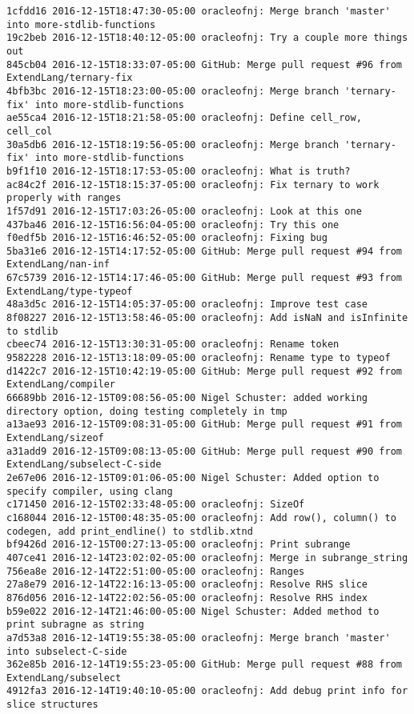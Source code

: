 \begin{lstlisting}
1cfdd16 2016-12-15T18:47:30-05:00 oracleofnj: Merge branch 'master' into more-stdlib-functions
19c2beb 2016-12-15T18:40:12-05:00 oracleofnj: Try a couple more things out
845cb04 2016-12-15T18:33:07-05:00 GitHub: Merge pull request #96 from ExtendLang/ternary-fix
4bfb3bc 2016-12-15T18:23:00-05:00 oracleofnj: Merge branch 'ternary-fix' into more-stdlib-functions
ae55ca4 2016-12-15T18:21:58-05:00 oracleofnj: Define cell_row, cell_col
30a5db6 2016-12-15T18:19:56-05:00 oracleofnj: Merge branch 'ternary-fix' into more-stdlib-functions
b9f1f10 2016-12-15T18:17:53-05:00 oracleofnj: What is truth?
ac84c2f 2016-12-15T18:15:37-05:00 oracleofnj: Fix ternary to work properly with ranges
1f57d91 2016-12-15T17:03:26-05:00 oracleofnj: Look at this one
437ba46 2016-12-15T16:56:04-05:00 oracleofnj: Try this one
f0edf5b 2016-12-15T16:46:52-05:00 oracleofnj: Fixing bug
5ba31e6 2016-12-15T14:17:52-05:00 GitHub: Merge pull request #94 from ExtendLang/nan-inf
67c5739 2016-12-15T14:17:46-05:00 GitHub: Merge pull request #93 from ExtendLang/type-typeof
48a3d5c 2016-12-15T14:05:37-05:00 oracleofnj: Improve test case
8f08227 2016-12-15T13:58:46-05:00 oracleofnj: Add isNaN and isInfinite to stdlib
cbeec74 2016-12-15T13:30:31-05:00 oracleofnj: Rename token
9582228 2016-12-15T13:18:09-05:00 oracleofnj: Rename type to typeof
d1422c7 2016-12-15T10:42:19-05:00 GitHub: Merge pull request #92 from ExtendLang/compiler
66689bb 2016-12-15T09:08:56-05:00 Nigel Schuster: added working directory option, doing testing completely in tmp
a13ae93 2016-12-15T09:08:31-05:00 GitHub: Merge pull request #91 from ExtendLang/sizeof
a31add9 2016-12-15T09:08:13-05:00 GitHub: Merge pull request #90 from ExtendLang/subselect-C-side
2e67e06 2016-12-15T09:01:06-05:00 Nigel Schuster: Added option to specify compiler, using clang
c171450 2016-12-15T02:33:48-05:00 oracleofnj: SizeOf
c168044 2016-12-15T00:48:35-05:00 oracleofnj: Add row(), column() to codegen, add print_endline() to stdlib.xtnd
bf9426d 2016-12-15T00:27:13-05:00 oracleofnj: Print subrange
407ce41 2016-12-14T23:02:02-05:00 oracleofnj: Merge in subrange_string
756ea8e 2016-12-14T22:51:00-05:00 oracleofnj: Ranges
27a8e79 2016-12-14T22:16:13-05:00 oracleofnj: Resolve RHS slice
876d056 2016-12-14T22:02:56-05:00 oracleofnj: Resolve RHS index
b59e022 2016-12-14T21:46:00-05:00 Nigel Schuster: Added method to print subragne as string
a7d53a8 2016-12-14T19:55:38-05:00 oracleofnj: Merge branch 'master' into subselect-C-side
362e85b 2016-12-14T19:55:23-05:00 GitHub: Merge pull request #88 from ExtendLang/subselect
4912fa3 2016-12-14T19:40:10-05:00 oracleofnj: Add debug print info for slice structures

\end{lstlisting}
